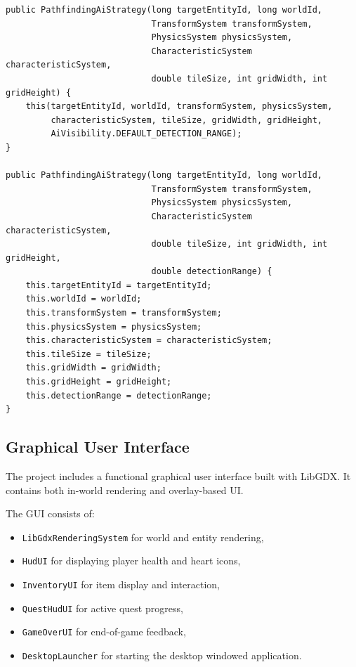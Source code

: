 \documentclass[12pt]{extarticle}
\begin{document}
\begin{lstlisting}[caption={Constructor overloading in PathfindingAiStrategy}]
public PathfindingAiStrategy(long targetEntityId, long worldId,
                             TransformSystem transformSystem,
                             PhysicsSystem physicsSystem,
                             CharacteristicSystem characteristicSystem,
                             double tileSize, int gridWidth, int gridHeight) {
    this(targetEntityId, worldId, transformSystem, physicsSystem,
         characteristicSystem, tileSize, gridWidth, gridHeight,
         AiVisibility.DEFAULT_DETECTION_RANGE);
}

public PathfindingAiStrategy(long targetEntityId, long worldId,
                             TransformSystem transformSystem,
                             PhysicsSystem physicsSystem,
                             CharacteristicSystem characteristicSystem,
                             double tileSize, int gridWidth, int gridHeight,
                             double detectionRange) {
    this.targetEntityId = targetEntityId;
    this.worldId = worldId;
    this.transformSystem = transformSystem;
    this.physicsSystem = physicsSystem;
    this.characteristicSystem = characteristicSystem;
    this.tileSize = tileSize;
    this.gridWidth = gridWidth;
    this.gridHeight = gridHeight;
    this.detectionRange = detectionRange;
}
\end{lstlisting}

\subsection{Graphical User Interface}
The project includes a functional graphical user interface built with LibGDX. It contains both in-world rendering and overlay-based UI.

The GUI consists of:
\begin{itemize}[leftmargin=1.5em]
    \item \texttt{LibGdxRenderingSystem} for world and entity rendering,
    \item \texttt{HudUI} for displaying player health and heart icons,
    \item \texttt{InventoryUI} for item display and interaction,
    \item \texttt{QuestHudUI} for active quest progress,
    \item \texttt{GameOverUI} for end-of-game feedback,
    \item \texttt{DesktopLauncher} for starting the desktop windowed application.
\end{itemize}
\end{document}
